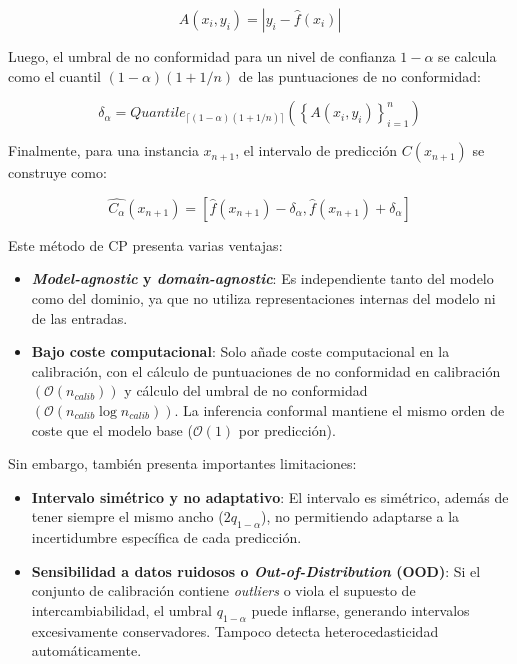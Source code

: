 $$
A(x_i, y_i) = | y_i - \hat{f}(x_i) |
$$

Luego, el umbral de no conformidad para un nivel de confianza $1-\alpha$ se calcula como el cuantil $(1-\alpha)(1+1/n)$ de las puntuaciones de no conformidad:

$$
\delta_\alpha = Quantile_{ \lceil  (1-\alpha) (1 + 1/n)  \rceil } ( \left\{ A(x_i,y_i) \right\}_{i=1}^n )
$$

Finalmente, para una instancia $x_{n+1}$, el intervalo de predicción $C(x_{n+1})$ se construye como: 

$$
\hat{C_\alpha}(x_{n+1}) = \left[ \hat{f}(x_{n+1}) - \delta_\alpha, \hat{f}(x_{n+1}) + \delta_\alpha\right]
$$

Este método de CP presenta varias ventajas: 

\begin{itemize}

    \item \textbf{\textit{Model-agnostic} y \textit{domain-agnostic}}: Es independiente tanto del modelo como del dominio, ya que no utiliza representaciones internas del modelo ni de las entradas. 
    
    \item \textbf{Bajo coste computacional}: Solo añade coste computacional en la calibración, con el cálculo de puntuaciones de no conformidad en calibración $\left( \mathcal{O}(n_{calib}) \right)$ y cálculo del umbral de no conformidad $\left( \mathcal{O}(n_{calib} \log n_{calib}) \right)$. La inferencia conformal mantiene el mismo orden de coste que el modelo base ($\mathcal{O}(1)$ por predicción). 

\end{itemize}

Sin embargo, también presenta importantes limitaciones: 

\begin{itemize}
    
    \item \textbf{Intervalo simétrico y no adaptativo}: El intervalo es simétrico, además de tener siempre el mismo ancho ($2q_{1-\alpha}$), no permitiendo adaptarse a la incertidumbre específica de cada predicción. 

    \item \textbf{Sensibilidad a datos ruidosos o \textit{Out-of-Distribution} (OOD)}: Si el conjunto de calibración contiene \textit{outliers} o viola el supuesto de intercambiabilidad, el umbral \(q_{1-\alpha}\) puede inflarse, generando intervalos excesivamente conservadores. Tampoco detecta heterocedasticidad automáticamente.

\end{itemize}

